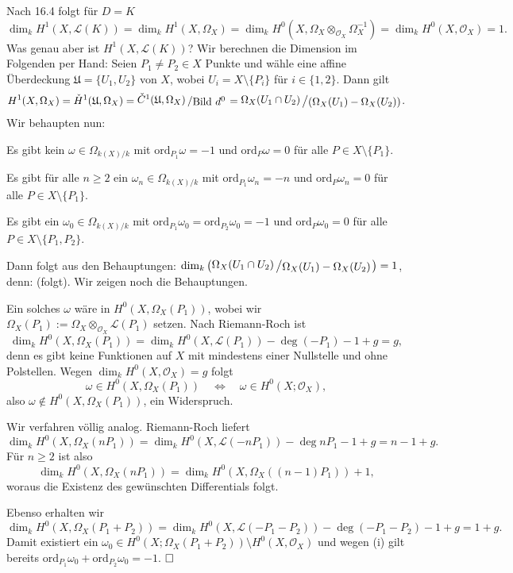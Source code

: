 \documentclass[11pt]{book}
\theoremstyle{nonumberbreak}
\newenvironment{pr}[1][]{\ifthenelse{\equal{#1}{}}{\proof}{\proof[#1]}\rm}{\endproof}
\newenvironment{ex}[1][]{\ifthenelse{\equal{#1}{}}{\example}{\example[#1]}\rm}{\endexample}
\newcommand{\LL}{\mathcal{L}}
\newcommand{\bild}{\mathrm{Bild}\ }
\newcommand{\slant}[2]{{\raisebox{.1em}{$#1$}\left/\raisebox{-.1em}{$#2$}\right.}}
\begin{document}
\begin{spacing}{1.4}
\begin{ex}
Nach 16.4 folgt für $D=K$
$$\dim_k H^{1}(X, \LL(K))= \dim_k H^{1}(X, \Omega_X) = \dim_k H^{0}(X, \Omega_X \otimes_{\mathcal{O}_X} \Omega_X^{-1}) = \dim_k H^{0}(X, \mathcal{O}_X) = 1.$$
Was genau aber ist $H^{1}(X, \LL(K))$? Wir berechnen die Dimension im Folgenden per Hand:
Seien $P_1 \neq P_2 \in X$ Punkte und wähle eine affine Überdeckung $\mathfrak{U}=\{U_1, U_2\}$ von $X$, wobei $U_i = X \setminus \{P_i\}$ für $i \in\{1,2\}$. Dann gilt 
$$H^{1}(X, \Omega_X) = \check{H}^{1}(\mathfrak{U}, \Omega_X) = \slant{\check{C}^{1}(\mathfrak{U}, \Omega_X)}{\bild d^{0}} = \slant{\Omega_X(U_1 \cap U_2)}{(\Omega_X(U_1) - \Omega_X(U_2))}.$$
Wir behaupten nun:
\begin{compactenum}
\item Es gibt kein $\omega \in \Omega_{k(X)/k}$ mit $\mathrm{ord}_{P_1} \omega = -1$ und $\mathrm{ord}_P\omega = 0$ für alle $P \in X \setminus \{P_1\}$. 
\item Es gibt für alle $n \geqslant 2$ ein $\omega_n \in \Omega_{k(X)/k}$ mit $\mathrm{ord}_{P_1} \omega_n = -n$ und $\mathrm{ord}_P \omega_n = 0$ für alle $P \in X \setminus \{P_1\}$. 
\item Es gibt ein $\omega_0 \in \Omega_{k(X)/k}$ mit $\mathrm{ord}_{P_1} \omega_0 = \mathrm{ord}_{P_2}\omega_0 = -1$ und $\mathrm{ord}_P \omega_0 = 0$ für alle $P \in X \setminus \{P_1, P_2\}$.
\end{compactenum}
Dann folgt aus den Behauptungen: $\dim_k \left( \slant{\Omega_X(U_1 \cap U_2)}{\Omega_X(U_1) - \Omega_X(U_2)} \right) = 1$, denn: (folgt). Wir zeigen noch die Behauptungen.
\begin{pr}
\begin{compactenum}
\item  Ein solches $\omega$ wäre in $H^{0}(X, \Omega_X(P_1))$, wobei wir 
$\Omega_X(P_1) := \Omega_X \otimes_{\mathcal{O}_X} \LL(P_1)$ setzen. Nach Riemann-Roch ist 
$$\dim_k H^{0}(X, \Omega_X(P_1)) = \dim_k H^{0}(X, \LL(P_1)) - \deg (-P_1) -1 + g = g,$$
denn es gibt keine Funktionen auf $X$ mit mindestens einer Nullstelle und ohne Polstellen. Wegen $\dim_k H^{0}(X, \mathcal{O}_X)=g$ folgt 
$$\omega \in H^{0}(X, \Omega_X(P_1)) \quad \Longleftrightarrow \quad \omega \in H^{0}(X; \mathcal{O}_X),$$
also $\omega \notin H^{0}(X, \Omega_X(P_1))$, ein Widerspruch.
\item Wir verfahren völlig analog. Riemann-Roch liefert
$$\dim_k H^{0}(X, \Omega_X(nP_1)) = \dim_k H^{0}(X, \LL(-nP_1)) - \deg nP_1 -1 + g = n-1 + g.$$
Für $n \geqslant 2$ ist also 
$$\dim_k H^{0}(X, \Omega_X(nP_1)) = \dim_k H^{0}(X, \Omega_X((n-1)P_1)) + 1,$$
woraus die Existenz des gewünschten Differentials folgt.
\item Ebenso erhalten wir
$$\dim_k H^{0}(X, \Omega_X(P_1+P_2)) = \dim_k H^{0}(X, \LL(-P_1-P_2)) - \deg (-P_1-P_2) - 1 + g = 1 + g.$$
Damit existiert ein $\omega_0 \in H^{0}(X; \Omega_X(P_1+P_2)) \setminus H^{0}(X, \mathcal{O}_X)$ und wegen (i) gilt bereits 
$\mathrm{ord}_{P_1} \omega_0 + \mathrm{ord}_{P_2} \omega_0 = -1$. $\hfill \Box$


\end{compactenum}
\end{pr}
\end{ex}
\end{spacing}
\end{document}
